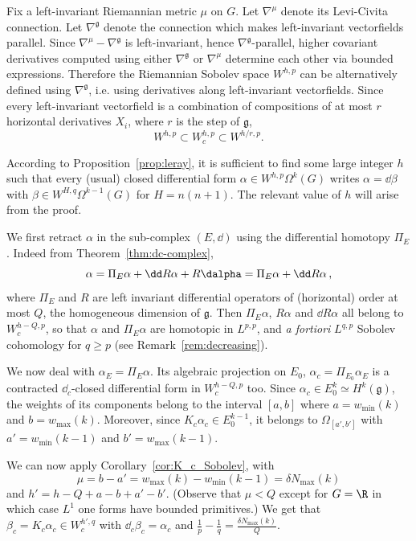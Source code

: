 Fix a left-invariant Riemannian metric $\mu$ on $G$. Let $\nabla^\mu$ denote its Levi-Civita connection. Let $\nabla^\mathfrak{g}$ denote the connection which makes left-invariant vectorfields parallel. Since $\nabla^\mu-\nabla^\mathfrak{g}$ is left-invariant, hence $\nabla^\mathfrak{g}$-parallel, higher covariant derivatives computed using either $\nabla^\mathfrak{g}$ or $\nabla^\mu$ determine each other via bounded expressions. Therefore the Riemannian Sobolev space $W^{h,p}$ can be alternatively defined using $\nabla^\mathfrak{g}$, i.e. using derivatives along left-invariant vectorfields. Since every left-invariant vectorfield is a combination of compositions of at most $r$ horizontal derivatives $X_i$, where $r$ is the step of $\mathfrak{g}$,
\begin{equation}\label{eq:14}
W^{h,p}\subset W_c^{h,p}\subset W^{h/r,p}.
\end{equation}

According to Proposition~\ref{prop:leray}, it is sufficient to find some large integer $h$ such that every (usual) closed differential form $\alpha \in W^{h,p}\Omega^k(G)$ writes $\alpha = \dd \beta$ with $\beta \in W^{H,q}\Omega^{k-1}(G)$ for $H=n(n+1)$. The relevant value of $h$ will arise from the proof.

We first retract $\alpha$ in the sub-complex $(E,\dd)$ using the differential homotopy $\Pi_E$. Indeed from Theorem~\ref{thm:dc-complex},
\[
\alpha = \Pi_E \alpha + \dd R\alpha + R \dalpha = \Pi_E \alpha + \dd R
\alpha \,,
\]
where $\Pi_E$ and $R$ are left invariant differential operators of (horizontal) order at most $Q$, the homogeneous dimension of $\mathfrak{g}$. Then $\Pi_E \alpha$, $R\alpha$ and $\dd R \alpha$ all belong to $W^{h-Q,p}_c$, so that $\alpha$ and $\Pi_E \alpha$ are homotopic in $L^{p,p}$, and \emph{a fortiori} $L^{q,p}$ Sobolev cohomology for $q\geq p$ (see Remark~\ref{rem:decreasing}).

We now deal with $\alpha_E= \Pi_E \alpha$. Its algebraic projection on $E_0$, $\alpha_c = \Pi_{E_0} \alpha_E$ is a contracted $\dd_c$-closed differential form in $W_c^{h-Q,p}$ too. Since $\alpha_c \in E_0^k \simeq H^k(\mathfrak{g})$, the weights of its components belong to the interval $[a,b]$ where $a=w_{\min} (k)$ and $b=w_{\max} (k)$. Moreover, since $K_c \alpha_c \in E_0^{k-1}$, it belongs to $\Omega_{[a',b']}$ with $a' = w_{\min}(k-1)$ and $b' = w_{\max}(k-1)$.

We can now apply Corollary~\ref{cor:K_c_Sobolev}, with
\[
\mu = b- a' = w_{\max}(k) - w_{\min}(k-1) = \delta N_{\max}(k)
\]
and $h' = h-Q + a-b + a' -b'$. (Observe that $\mu < Q$ except for $G=\R$ in which case $L^1$ one forms have bounded primitives.) We get that $\beta_c = K_c \alpha_c \in W^{h',q}_c$ with $\dd_c \beta_c = \alpha_c$ and $\frac{1}{p}-\frac{1}{q}=\frac{\delta N_{\max}(k)}{Q}$.

